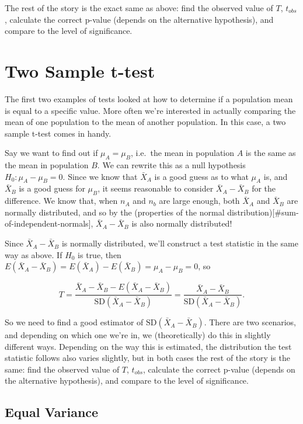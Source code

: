 \documentclass[]{book}
\theoremstyle{definition}
\theoremstyle{definition}
\theoremstyle{definition}
\theoremstyle{remark}
\begin{document}
The rest of the story is the exact same as above: find the observed value of \(T\), \(t_{obs}\), calculate the correct p-value (depends on the alternative hypothesis), and compare to the level of significance.

\hypertarget{two-sample-t-test}{%
\section{Two Sample t-test}\label{two-sample-t-test}}

The first two examples of tests looked at how to determine if a population mean is equal to a specific value. More often we're interested in actually comparing the mean of one population to the mean of another population. In this case, a two sample t-test comes in handy.

Say we want to find out if \(\mu_A = \mu_B\), i.e.~the mean in population \(A\) is the same as the mean in population \(B\). We can rewrite this as a null hypothesis \(H_0: \mu_A - \mu_B = 0\). Since we know that \(\bar{X}_A\) is a good guess as to what \(\mu_A\) is, and \(\bar{X}_B\) is a good guess for \(\mu_B\), it seems reasonable to consider \(\bar{X}_A - \bar{X}_B\) for the difference. We know that, when \(n_A\) and \(n_b\) are large enough, both \(\bar{X}_A\) and \(\bar{X}_B\) are normally distributed, and so by the (properties of the normal distribution){[}\#sum-of-independent-normals{]}, \(\bar{X}_A - \bar{X}_B\) is also normally distributed!

Since \(\bar{X}_A - \bar{X}_B\) is normally distributed, we'll construct a test statistic in the same way as above. If \(H_0\) is true, then \(E(\bar{X}_A - \bar{X}_B) = E(\bar{X}_A) - E(\bar{X}_B) = \mu_A - \mu_B = 0\), so

\[
  T = \frac{\bar{X}_A - \bar{X}_B - E(\bar{X}_A - \bar{X}_B)}{\text{SD}(\bar{X}_A - \bar{X}_B)} = \frac{\bar{X}_A - \bar{X}_B}{\text{SD}(\bar{X}_A - \bar{X}_B)}.
\]

So we need to find a good estimator of \(\text{SD}(\bar{X}_A - \bar{X}_B)\). There are two scenarios, and depending on which one we're in, we (theoretically) do this in slightly different ways. Depending on the way this is estimated, the distribution the test statistic follows also varies slightly, but in both cases the rest of the story is the same: find the observed value of \(T\), \(t_{obs}\), calculate the correct p-value (depends on the alternative hypothesis), and compare to the level of significance.

\hypertarget{equal-variance}{%
\subsection{Equal Variance}\label{equal-variance}}
\end{document}
